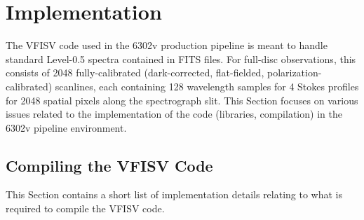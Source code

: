 \documentclass[11pt]{article}
\begin{document}
\clearpage
\section{Implementation}

The VFISV code used in the \solisvsm 6302v production pipeline is meant to handle standard
\solisvsm Level-0.5 spectra contained in FITS files.  For full-disc observations, this 
consists of 2048 fully-calibrated (dark-corrected, flat-fielded, polarization-calibrated)
scanlines, each containing 128 wavelength samples for 4 Stokes profiles for 2048 spatial pixels
along the spectrograph slit.  This Section focuses on various issues related to the
implementation of the code (libraries, compilation) in the 6302v pipeline environment.\\

\subsection{Compiling the VFISV Code}

This Section contains a short list of implementation details relating to what is required
to compile the VFISV code.
\end{document}
